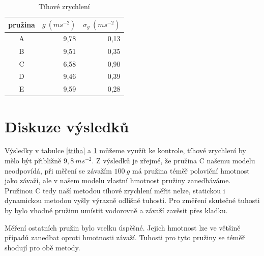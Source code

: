 \documentclass{article}
\begin{document}
\begin{table}[htbp]
\begin{center}
\begin{tabular}{|c|r|r|}
\hline
pružina & \multicolumn{1}{c|}{$ g ~(ms^{-2})   $} & \multicolumn{1}{c|}{$ \sigma _{g} ~(ms^{-2})   $} \\ \hline
A & 9,78 & 0,13 \\ \hline
B & 9,51 & 0,35 \\ \hline
C & 6,58 & 0,90 \\ \hline
D & 9,46 & 0,39 \\ \hline
E & 9,59 & 0,28 \\ \hline
\end{tabular}
\caption{Tíhové zrychlení}
\label{ttihavysl}
\end{center}

\end{table}




\section*{Diskuze výsledků}

Výsledky v tabulce \ref{ttiha} a \ref{ttihavysl} můžeme využít ke kontrole, tíhové zrychlení by mělo být přibližně $9,8~ms^{-2}$. Z výsledků je zřejmé, že pružina C našemu modelu neodpovídá, při měření se závažím $100~g$ má pružina téměř poloviční hmotnost jako závaží, ale v našem modelu vlastní hmotnost pružiny zanedbáváme. Pružinou C tedy naší metodou tíhové zrychlení měřit nelze, statickou i dynamickou metodou vyšly výrazně odlišné tuhosti. Pro změření skutečné tuhosti by bylo vhodné pružinu umístit vodorovně a závaží zavěsit přes kladku.

Měření ostatních pružin bylo vcelku úspěšné. Jejich hmotnost lze ve většině případů zanedbat oproti hmotnosti závaží. Tuhosti pro tyto pružiny se téměř shodují pro obě metody.
\end{document}
